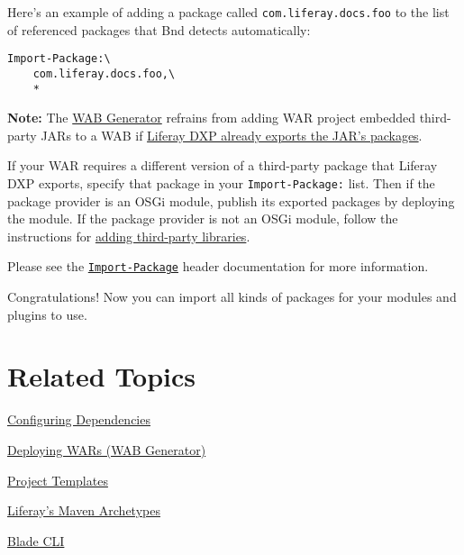 \noindent\hrulefill

Here's an example of adding a package called
\texttt{com.liferay.docs.foo} to the list of referenced packages that
Bnd detects automatically:

\begin{verbatim}
Import-Package:\
    com.liferay.docs.foo,\
    *
\end{verbatim}

\noindent\hrulefill

\textbf{Note:} The
\href{/docs/7-2/customization/-/knowledge_base/c/deploying-wars-wab-generator}{WAB
Generator} refrains from adding WAR project embedded third-party JARs to
a WAB if
\href{/docs/7-2/customization/-/knowledge_base/c/understanding-excluded-jars}{Liferay
DXP already exports the JAR's packages}.

If your WAR requires a different version of a third-party package that
Liferay DXP exports, specify that package in your
\texttt{Import-Package:} list. Then if the package provider is an OSGi
module, publish its exported packages by deploying the module. If the
package provider is not an OSGi module, follow the instructions for
\href{/docs/7-2/customization/-/knowledge_base/c/adding-third-party-libraries-to-a-module}{adding
third-party libraries}.

\noindent\hrulefill

Please see the
\href{https://bnd.bndtools.org/heads/import_package.html}{\texttt{Import-Package}}
header documentation for more information.

Congratulations! Now you can import all kinds of packages for your
modules and plugins to use.

\section{Related Topics}\label{related-topics-4}

\href{/docs/7-2/customization/-/knowledge_base/c/configuring-dependencies}{Configuring
Dependencies}

\href{/docs/7-2/customization/-/knowledge_base/c/deploying-wars-wab-generator}{Deploying
WARs (WAB Generator)}

\href{/docs/7-2/reference/-/knowledge_base/r/project-templates}{Project
Templates}

\href{/docs/7-2/reference/-/knowledge_base/r/maven}{Liferay's Maven
Archetypes}

\href{/docs/7-2/reference/-/knowledge_base/r/blade-cli}{Blade CLI}

